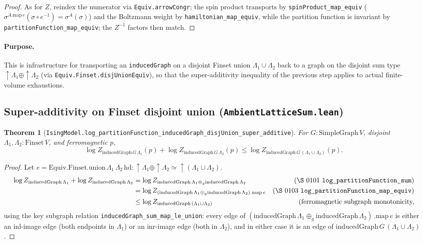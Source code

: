 \documentclass[a4paper,11pt]{article}
\newtheorem{theorem}{Theorem}
\begin{document}
\begin{proof}
As for $Z$, reindex the numerator via \texttt{Equiv.arrowCongr}; the spin
product transports by \texttt{spinProduct\_map\_equiv}
($\sigma^{A.\mathrm{map}\,e}(\sigma\circ e^{-1})=\sigma^{A}(\sigma)$) and the
Boltzmann weight by \texttt{hamiltonian\_map\_equiv}, while the partition
function is invariant by \texttt{partitionFunction\_map\_equiv}; the
$Z^{-1}$ factors then match.
\end{proof}

\paragraph{Purpose.} This is infrastructure for transporting an
\texttt{inducedGraph} on a disjoint Finset union
$\Lambda_1 \cup \Lambda_2$ back to a graph on the disjoint sum
type $\uparrow\Lambda_1 \oplus \uparrow\Lambda_2$
(via \texttt{Equiv.Finset.disjUnionEquiv}), so that the
super-additivity inequality of the previous step applies to
actual finite-volume exhaustions.

\subsection{Super-additivity on Finset disjoint union
(\texttt{AmbientLatticeSum.lean})}

\begin{theorem}[\texttt{IsingModel.log\_partitionFunction\_inducedGraph\_disjUnion\_super\_additive}]
For $G \colon \mathrm{SimpleGraph}\,V$, disjoint
$\Lambda_1, \Lambda_2 : \mathrm{Finset}\,V$, and ferromagnetic $p$,
\[
  \log Z_{\mathrm{inducedGraph}\,G\,\Lambda_1}(p)
  + \log Z_{\mathrm{inducedGraph}\,G\,\Lambda_2}(p)
  \le \log Z_{\mathrm{inducedGraph}\,G\,(\Lambda_1 \cup \Lambda_2)}(p).
\]
\end{theorem}

\begin{proof}
Let $e = \mathrm{Equiv.Finset.union}\,\Lambda_1\,\Lambda_2\,\mathrm{hd}
  \colon \uparrow\!\Lambda_1 \oplus \uparrow\!\Lambda_2
     \simeq \uparrow\!(\Lambda_1 \cup \Lambda_2)$.
\begin{align*}
  \log Z_{\mathrm{inducedGraph}\,\Lambda_1}
  + \log Z_{\mathrm{inducedGraph}\,\Lambda_2}
  &= \log Z_{\mathrm{inducedGraph}\,\Lambda_1
      \oplus_g \mathrm{inducedGraph}\,\Lambda_2}
     & \text{(\S 0101 \texttt{log\_partitionFunction\_sum})} \\
  &= \log Z_{(\mathrm{inducedGraph}\,\Lambda_1
      \oplus_g \mathrm{inducedGraph}\,\Lambda_2).\mathrm{map}\,e}
     & \text{(\S 0103 \texttt{log\_partitionFunction\_map\_equiv})} \\
  &\le \log Z_{\mathrm{inducedGraph}\,(\Lambda_1 \cup \Lambda_2)}
     & \text{(ferromagnetic subgraph monotonicity,}
\end{align*}
using the key subgraph relation \texttt{inducedGraph\_sum\_map\_le\_union}:
every edge of $(\mathrm{inducedGraph}\,\Lambda_1
\oplus_g \mathrm{inducedGraph}\,\Lambda_2)\,.\mathrm{map}\,e$ is
either an $\mathrm{inl}$-image edge (both endpoints in $\Lambda_1$)
or an $\mathrm{inr}$-image edge (both in $\Lambda_2$), and in either
case it is an edge of $\mathrm{inducedGraph}\,G\,(\Lambda_1 \cup \Lambda_2)$.
\end{proof}
\end{document}

